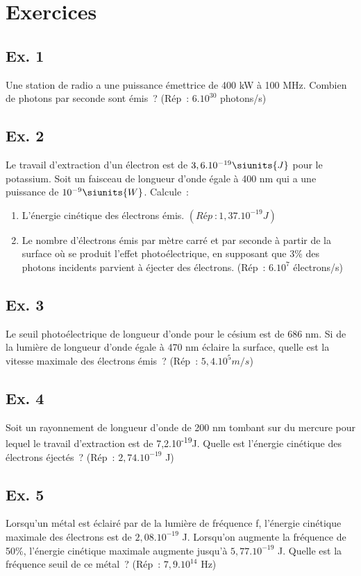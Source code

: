 {\section{Exercices}\label{exercices-photons}


\subsection{Ex. 1}
Une station de radio a une puissance émettrice de 400 kW à 100 MHz.
Combien de photons par seconde sont émis~? (Rép~:
$6.10^{30}$ photons/s)

\subsection{Ex. 2}
Le travail d'extraction d'un électron est de $3,6.10^{-19} \siunits{J}$ pour le potassium.
Soit un faisceau de longueur d'onde égale à 400 nm
qui a une puissance de $10^{-9} \siunits{W}$. Calcule~:
\begin{enumerate}
\item  L'énergie cinétique des électrons émis. $(Rép~:
  1,37.10^{-19} J)$
\item  Le nombre d'électrons émis par mètre carré et par seconde à partir de
  la surface où se produit l'effet photoélectrique, en supposant que 3\%
  des photons incidents parvient à éjecter des électrons. (Rép~:
  $6.10^7$ électrons/s)
\end{enumerate}

\subsection{Ex. 3}
Le seuil photoélectrique de longueur d'onde pour le césium est de 686
nm. Si de la lumière de longueur d'onde égale à 470 nm éclaire la
surface, quelle est la vitesse maximale des électrons émis~? (Rép~:
$5,4.10^5 m/s$)

\subsection{Ex. 4}
Soit un rayonnement de longueur d'onde de 200 nm tombant sur du mercure
pour lequel le travail d'extraction est de 7,2.10\textsuperscript{-19}J.
Quelle est l'énergie cinétique des électrons éjectés~? (Rép~:
$2,74.10^{-19}$ J)

\subsection{Ex. 5}
Lorsqu'un métal est éclairé par de la lumière de fréquence f, l'énergie
cinétique maximale des électrons est de $2,08.10^{-19}$ J.
Lorsqu'on augmente la fréquence de 50\%, l'énergie cinétique maximale
augmente jusqu'à $5,77.10^{-19}$ J.
Quelle est la fréquence seuil de ce métal~? (Rép~: $7,9.10^{14}$ Hz)

}
